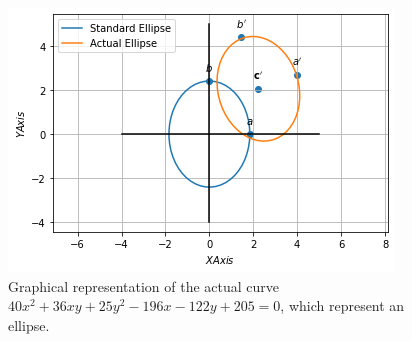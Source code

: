 \begin{figure}[!]
 \begin{center}
  \includegraphics[width=\columnwidth]{solutions/41/20/assignment6_fig.png}
    \caption{Graphical representation of the actual curve  $40{x^2}+36{xy}+25{y^2}-196{x}-122{y}+205=0$, which represent an ellipse.}
\label{eq:solutions/41/20/myfig:1}
    \end{center}
\end{figure}
